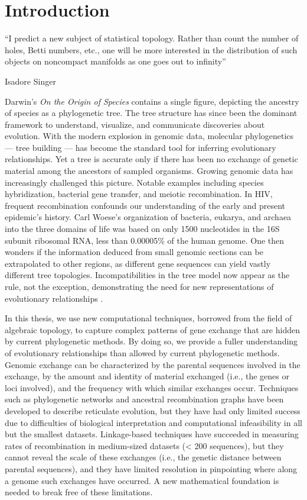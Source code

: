 \chapter{Introduction}
\label{ch:introduction}

\epigraph{``I predict a new subject of statistical topology. Rather than count the
number of holes, Betti numbers, etc., one will be more interested in the
distribution of such objects on noncompact manifolds as one goes out
to infinity''}{Isadore Singer}

Darwin’s \emph{On the Origin of Species} contains a single figure, depicting the ancestry of species as a phylogenetic tree.
The tree structure has since been the dominant framework to understand, visualize, and communicate discoveries about evolution.
With the modern explosion in genomic data, molecular phylogenetics –-- tree building –-- has become the standard tool for inferring evolutionary relationships. 
Yet a tree is accurate only if there has been no exchange of genetic material among the ancestors of sampled organisms.
Growing genomic data has increasingly challenged this picture.
Notable examples including species hybridization, bacterial gene transfer, and meiotic recombination.
In HIV, frequent recombination confounds our understanding of the early and present epidemic’s history.
Carl Woese’s organization of bacteria, eukarya, and archaea into the three domains of life was based on only 1500 nucleotides in the 16S subunit ribosomal RNA, less than 0.00005\% of the human genome.
One then wonders if the information deduced from small genomic sections can be extrapolated to other regions, as different gene sequences can yield vastly different tree topologies.
Incompatibilities in the tree model now appear as the rule, not the exception, demonstrating the need for new representations of evolutionary relationships \autocite{Doolittle:1999,Doolittle:2006}.

In this thesis, we use new computational techniques, borrowed from the field of algebraic topology, to capture complex patterns of gene exchange that are hidden by current phylogenetic methods.
By doing so, we provide a fuller understanding of evolutionary relationships than allowed by current phylogenetic methods.
Genomic exchange can be characterized by the parental sequences involved in the exchange, by the amount and identity of material exchanged (i.e., the genes or loci involved), and the frequency with which similar exchanges occur.
Techniques such as phylogenetic networks and ancestral recombination graphs have been developed to describe reticulate evolution, but they have had only limited success due to difficulties of biological interpretation and computational infeasibility in all but the smallest datasets.
Linkage-based techniques have succeeded in measuring rates of recombination in medium-sized datasets (< 200 sequences), but they cannot reveal the scale of these exchanges (i.e., the genetic distance between parental sequences), and they have limited resolution in pinpointing where along a genome such exchanges have occurred.
A new mathematical foundation is needed to break free of these limitations.

